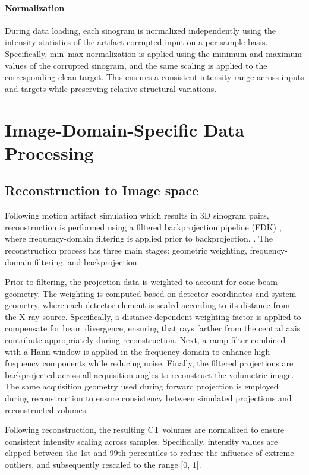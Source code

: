 \paragraph{Normalization}

During data loading, each sinogram is normalized independently using the intensity statistics of the artifact-corrupted input on a per-sample basis. Specifically, min–max normalization is applied using the minimum and maximum values of the corrupted sinogram, and the same scaling is applied to the corresponding clean target. This ensures a consistent intensity range across inputs and targets while preserving relative structural variations.

 

\section{Image-Domain-Specific Data Processing}
\subsection{Reconstruction to Image space}
Following motion artifact simulation which results in 3D sinogram pairs, reconstruction is performed using a filtered backprojection pipeline (FDK) \cite{feldkamp1984practical}, where frequency-domain filtering is applied prior to backprojection. \cite{diffct2025}. The reconstruction process has three main stages: geometric weighting, frequency-domain filtering, and backprojection. 

Prior to filtering, the projection data is weighted to account for cone-beam geometry. The weighting is computed based on detector coordinates and system geometry, where each detector element is scaled according to its distance from the X-ray source. Specifically, a distance-dependent weighting factor is applied to compensate for beam divergence, ensuring that rays farther from the central axis contribute appropriately during reconstruction. Next, a ramp filter combined with a Hann window is applied in the frequency domain to enhance high-frequency components while reducing noise. Finally, the filtered projections are backprojected across all acquisition angles to reconstruct the volumetric image. The same acquisition geometry used during forward projection is employed during reconstruction to ensure consistency between simulated projections and reconstructed volumes. 

Following reconstruction, the resulting CT volumes are normalized to ensure consistent intensity scaling across samples. Specifically, intensity values are clipped between the 1st and 99th percentiles to reduce the influence of extreme outliers, and subsequently rescaled to the range [0, 1]. 


